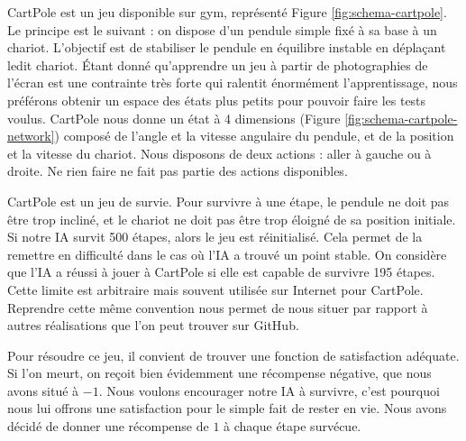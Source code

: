 CartPole est un jeu disponible sur gym, représenté Figure \ref{fig:schema-cartpole}. Le principe est le suivant : on dispose d'un pendule simple fixé à sa base à un chariot. L'objectif est de stabiliser
le pendule en équilibre instable en déplaçant ledit chariot. Étant donné qu'apprendre un jeu à partir de photographies de l'écran est une contrainte très forte 
qui ralentit énormément l'apprentissage, nous préférons obtenir un espace des états plus petits pour pouvoir faire les tests voulus. CartPole nous donne un 
état à 4 dimensions (Figure \ref{fig:schema-cartpole-network}) composé de l'angle et la vitesse angulaire du pendule, et de la position et la vitesse du chariot.
Nous disposons de deux actions : aller à gauche ou à droite. Ne rien faire ne fait pas partie des actions disponibles.

CartPole est un jeu de survie. Pour survivre à une étape, le pendule ne doit pas être trop incliné, et le chariot ne doit pas être trop éloigné de sa position
initiale. Si notre IA survit 500 étapes, alors le jeu est réinitialisé. Cela permet de la remettre en difficulté dans le cas où l'IA a trouvé un
point stable. On considère que l'IA a réussi à jouer à CartPole si elle est capable de survivre 195 étapes. Cette limite est arbitraire mais souvent utilisée sur
Internet pour CartPole. Reprendre cette même convention nous permet de nous situer par rapport à autres réalisations que l'on peut trouver sur GitHub.

Pour résoudre ce jeu, il convient de trouver une fonction de satisfaction adéquate. Si l'on meurt, on reçoit bien évidemment une récompense négative, que nous
avons situé à $-1$. Nous voulons encourager notre IA à survivre, c'est pourquoi nous lui offrons une satisfaction pour le simple fait de rester en vie. Nous avons
décidé de donner une récompense de $1$ à chaque étape survécue.


